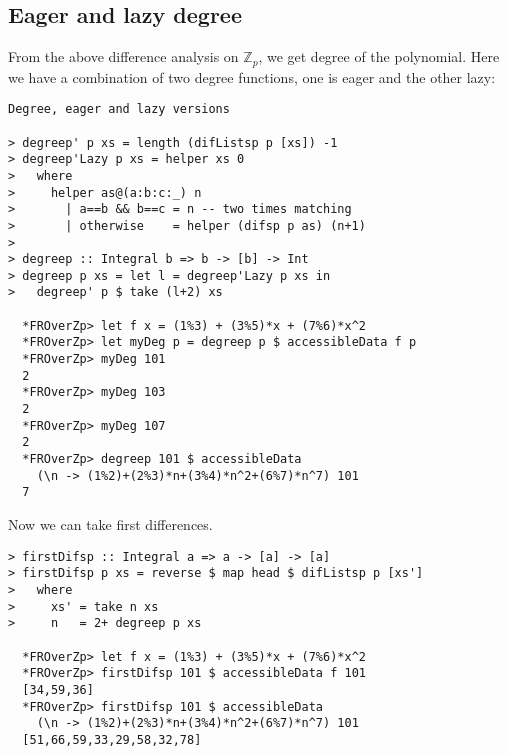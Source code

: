 \documentclass[11pt]{book}
\begin{document}
\subsection{Eager and lazy degree}
From the above difference analysis on $\mathbb{Z}_p$, we get degree of the polynomial.
Here we have a combination of two degree functions, one is eager and the other lazy:
\begin{verbatim}
Degree, eager and lazy versions

> degreep' p xs = length (difListsp p [xs]) -1
> degreep'Lazy p xs = helper xs 0
>   where
>     helper as@(a:b:c:_) n
>       | a==b && b==c = n -- two times matching
>       | otherwise    = helper (difsp p as) (n+1)
>
> degreep :: Integral b => b -> [b] -> Int
> degreep p xs = let l = degreep'Lazy p xs in
>   degreep' p $ take (l+2) xs

  *FROverZp> let f x = (1%3) + (3%5)*x + (7%6)*x^2
  *FROverZp> let myDeg p = degreep p $ accessibleData f p
  *FROverZp> myDeg 101
  2
  *FROverZp> myDeg 103
  2
  *FROverZp> myDeg 107
  2
  *FROverZp> degreep 101 $ accessibleData 
    (\n -> (1%2)+(2%3)*n+(3%4)*n^2+(6%7)*n^7) 101
  7
\end{verbatim}
Now we can take first differences.
\begin{verbatim}
> firstDifsp :: Integral a => a -> [a] -> [a]
> firstDifsp p xs = reverse $ map head $ difListsp p [xs']
>   where
>     xs' = take n xs
>     n   = 2+ degreep p xs

  *FROverZp> let f x = (1%3) + (3%5)*x + (7%6)*x^2
  *FROverZp> firstDifsp 101 $ accessibleData f 101
  [34,59,36]
  *FROverZp> firstDifsp 101 $ accessibleData 
    (\n -> (1%2)+(2%3)*n+(3%4)*n^2+(6%7)*n^7) 101
  [51,66,59,33,29,58,32,78]
\end{verbatim}
\end{document}
